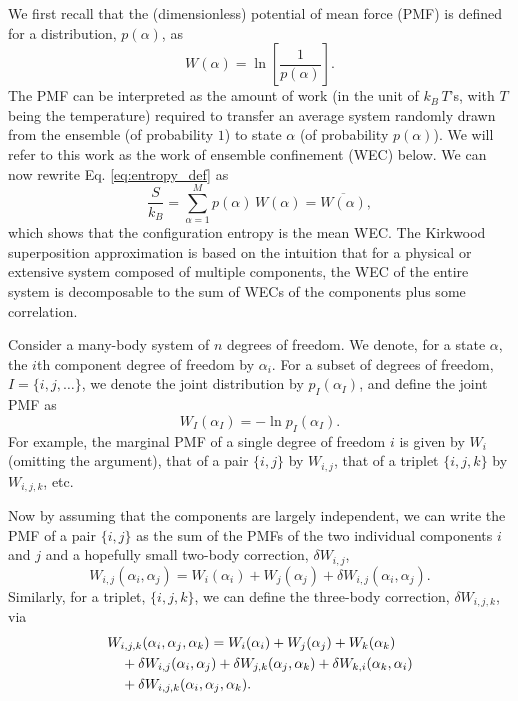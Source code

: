\documentclass[preprint, superscriptaddress]{revtex4-1}
\begin{document}
We first recall that the (dimensionless) potential of mean force (PMF)
is defined for a distribution, $p(\alpha)$,
as
$$
W(\alpha) = \ln\left[ \frac{1}{p(\alpha)} \right].
$$
The PMF can be interpreted as the amount of work
(in the unit of $k_B \, T$'s, with $T$ being the temperature)
required to transfer an average system randomly drawn from the ensemble (of probability $1$)
to state $\alpha$ (of probability $p(\alpha)$).
%
We will refer to this work as the work of ensemble confinement (WEC) below.
%
We can now rewrite Eq. \eqref{eq:entropy_def} as
%
\begin{equation}
  \frac{S}{k_B}
  =
  \sum_{\alpha = 1}^M p(\alpha) \, W(\alpha)
  =
  \overline{ W(\alpha) }
  ,
  \label{eq:S_W}
\end{equation}
%
which shows that the configuration entropy
is the mean WEC.
%
The Kirkwood superposition approximation is based on the intuition
that for a physical or extensive system composed of multiple components,
the WEC of the entire system is decomposable to the sum of WECs of the components
plus some correlation.
%

Consider a many-body system of $n$ degrees of freedom.
%
We denote, for a state $\alpha$, the $i$th component degree of freedom by $\alpha_i$.
%
%
For a subset of degrees of freedom, $I = \{i, j, \dots\}$,
we denote the joint distribution by $p_I(\alpha_I)$,
and define the joint PMF as
%
\begin{equation}
  W_I(\alpha_I) = -\ln p_I(\alpha_I)
  .
  \label{eq:WI_def}
\end{equation}
%
For example,
the marginal PMF of a single degree of freedom $i$ is given by $W_i$ (omitting the argument),
that of a pair $\{i, j\}$ by $W_{i, j}$,
that of a triplet $\{i, j, k\}$ by $W_{i, j, k}$, etc.

Now by assuming that the components are largely independent,
we can write the PMF of a pair $\{i, j\}$
as the sum of the PMFs of the two individual components $i$ and $j$
and a hopefully small two-body correction, $\delta W_{i,j}$,
%
\begin{equation}
  W_{i,j}(\alpha_i, \alpha_j)
  =
  W_i(\alpha_i) + W_j(\alpha_j)
  + \delta W_{i,j}(\alpha_i, \alpha_j)
  .
  \label{eq:W_ij}
\end{equation}
%
Similarly, for a triplet, $\{i, j, k\}$,
we can define the three-body correction, $\delta W_{i,j,k}$, via
%
\begin{align}
  &W_{i,j,k}(\alpha_i, \alpha_j, \alpha_k)
  =
  W_i(\alpha_i) + W_j(\alpha_j) + W_k(\alpha_k)
  \notag \\
  &\quad
  + \delta W_{i,j}(\alpha_i, \alpha_j)
  + \delta W_{j,k}(\alpha_j, \alpha_k)
  + \delta W_{k,i}(\alpha_k, \alpha_i)
  \notag \\
  &\quad
  + \delta W_{i,j,k}(\alpha_i, \alpha_j, \alpha_k)
  .
  \label{eq:W_ijk}
\end{align}
%
\end{document}
